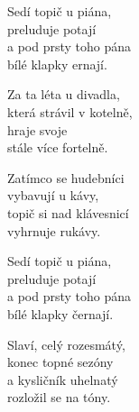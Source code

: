 
\ve{}
Sedí topič u piána,\\
preluduje potají\\
a pod prsty toho pána\\
bílé klapky ernají. 

\ve{}
Za ta léta u divadla,\\
která strávil v kotelně,\\
hraje svoje \\
stále více fortelně. 

\cho{}
Zatímco se hudebníci\\
vybavují u kávy,\\
topič si nad klávesnicí\\
vyhrnuje rukávy. 

\ve{}
Sedí topič u piána,\\
preluduje potají\\
a pod prsty toho pána\\
bílé klapky černají. 

\ve{}
Slaví, celý rozesmátý,\\
konec topné sezóny\\
a kysličník uhelnatý\\
rozložil se na tóny.

\esong{}